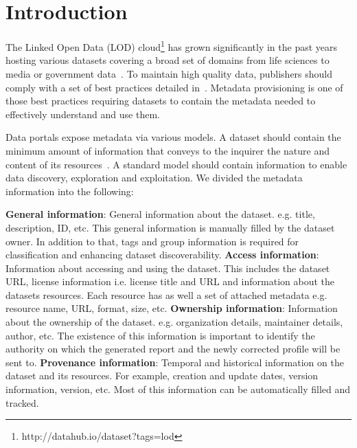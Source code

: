 \documentclass[runningheads,a4paper]{llncs}
\begin{document}

\section{Introduction}
\label{sec:introduction}

The Linked Open Data (LOD) cloud\footnote{http://datahub.io/dataset?tags=lod} has grown significantly in the past years hosting various datasets covering a broad set of domains from life sciences to media or government data~\cite{BizerHeath2009}. To maintain high quality data, publishers should comply with a set of best practices detailed in~\cite{Bizer:2011:EWG:2075914.2075915}. Metadata provisioning is one of those best practices requiring datasets to contain the metadata needed to effectively understand and use them.

Data portals expose metadata via various models. A dataset should contain the minimum amount of information that conveys to the inquirer the nature and content of its resources~\cite{nebert2004developing}. A standard model should contain information to enable data discovery, exploration and exploitation. We divided the metadata information into the following:

\textbf{General information}: General information about the dataset. e.g. title, description, ID, etc. This general information is manually filled by the dataset owner. In addition to that, tags and group information is required for classification and enhancing dataset discoverability.
\textbf{Access information}: Information about accessing and using the dataset. This includes the dataset URL, license information i.e. license title and URL and information about the datasets resources. Each resource has as well a set of attached metadata e.g. resource name, URL, format, size, etc.
\textbf{Ownership information}: Information about the ownership of the dataset. e.g. organization details, maintainer details, author, etc. The existence of this information is important to identify the authority on which the generated report and the newly corrected profile will be sent to.
\textbf{Provenance information}: Temporal and historical information on the dataset and its resources. For example, creation and update dates, version information, version, etc. Most of this information can be automatically filled and tracked.
\end{document}
